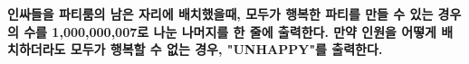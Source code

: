 \bf{인싸}들을 파티룸의 남은 자리에 배치했을때, \bf{모두가 행복한 파티}를 만들 수 있는 경우의 수를 1,000,000,007로 나눈 나머지를 한 줄에 출력한다. 만약 인원을 어떻게 배치하더라도 모두가 행복할 수 없는 경우, "UNHAPPY"를 출력한다.
